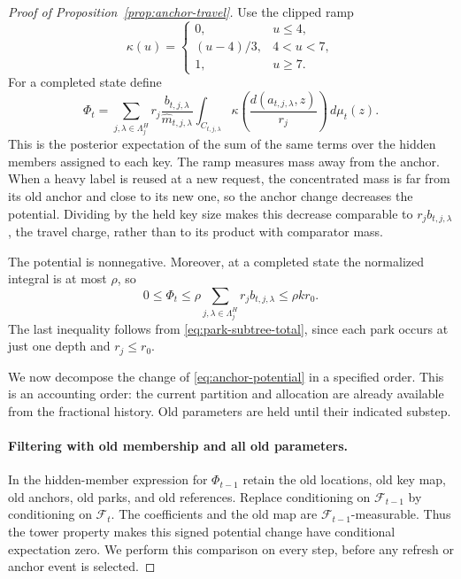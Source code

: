\begin{proof}[Proof of Proposition~\ref{prop:anchor-travel}]
Use the clipped ramp
\[
 \kappa(u)=
 \begin{cases}
  0,&u\le4,\\
  (u-4)/3,&4<u<7,\\
  1,&u\ge7.
 \end{cases}
\]
For a completed state define
\begin{equation}\label{eq:anchor-potential}
 \Phi_t=\sum_{j,\lambda\in\Lambda_j^H}
    r_j\frac{b_{t,j,\lambda}}{\widehat m_{t,j,\lambda}}
    \int_{C_{t,j,\lambda}}
           \kappa\!\left(\frac{d(a_{t,j,\lambda},z)}{r_j}\right)
                                                   \,d\mu_t(z).
\end{equation}
This is the posterior expectation of the sum of the same terms over
the hidden members assigned to each key.  The ramp measures mass away
from the anchor.  When a heavy label is reused at a new request, the
concentrated mass is far from its old anchor and close to its new one,
so the anchor change decreases the potential.  Dividing by the held
key size makes this decrease comparable to $r_jb_{t,j,\lambda}$,
the travel charge, rather than to its product with comparator mass.

The potential is nonnegative.  Moreover,
at a completed state the normalized integral is at most $\rho$, so
\begin{equation}\label{eq:anchor-potential-endpoints}
 0\le\Phi_t\le\rho\sum_{j,\lambda\in\Lambda_j^H}r_jb_{t,j,\lambda}
                         \le\rho k r_0.
\end{equation}
The last inequality follows from \eqref{eq:park-subtree-total}, since
each park occurs at just one depth and $r_j\le r_0$.

We now decompose the change of \eqref{eq:anchor-potential} in a specified
order.  This is an accounting order: the current partition and allocation
are already available from the fractional history.  Old parameters are
held until their indicated substep.

\paragraph{Filtering with old membership and all old parameters.}
In the hidden-member expression for $\Phi_{t-1}$ retain the old locations,
old key map, old anchors, old parks, and old references.  Replace
conditioning on $\mathcal F_{t-1}$ by conditioning on $\mathcal F_t$.
The coefficients and the old map are $\mathcal F_{t-1}$-measurable.
Thus the tower property makes this signed potential change have
conditional expectation zero.  We perform this comparison on every
step, before any refresh or anchor event is selected.


\end{proof}
